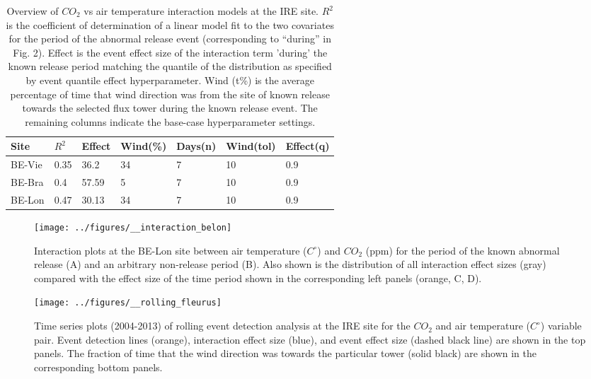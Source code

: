 \documentclass{article}
\begin{document}
\begin{table}[]
	\centering
	\caption{Overview of $CO_2$ vs air temperature interaction models at the IRE site. $R^2$ is the coefficient of determination of a linear model fit to the two covariates for the period of the abnormal release event (corresponding to “during” in Fig. 2). Effect is the event effect size of the interaction term 'during' the known release period matching the quantile of the distribution as specified by event quantile effect hyperparameter. Wind (t\%) is the average percentage of time that wind direction was from the site of known release towards the selected flux tower during the known release event. The remaining columns indicate the base-case hyperparameter settings.}
	\begin{tabular}{@{}lllllll@{}}
	\toprule
	Site & $R^2$ & Effect & Wind(\%) & Days(n) & Wind(tol) & Effect(q) \\ \midrule
	BE-Vie & 0.35 & 36.2  & 34 & 7 & 10 & 0.9  \\
	BE-Bra & 0.4 & 57.59  & 5 & 7 & 10 & 0.9 \\
	BE-Lon & 0.47 & 30.13 & 34 & 7 & 10 & 0.9 \\ \bottomrule
	\end{tabular}	
	\label{table:1}
	\end{table}

\begin{figure}
	\centering
	\texttt{[image: ../figures/\_\_interaction\_belon]}
	\caption{Interaction plots at the BE-Lon site between air temperature ($C^{\circ}$) and $CO_2$ (ppm) for the period of the known abnormal release (A) and an arbitrary non-release period (B). Also shown is the distribution of all interaction effect sizes (gray) compared with the effect size of the time period shown in the corresponding left panels (orange, C, D).}
	\label{fig:interaction}
\end{figure}


\begin{figure}
	\centering
	\texttt{[image: ../figures/\_\_rolling\_fleurus]}
	\caption{Time series plots (2004-2013) of rolling event detection analysis at the IRE site for the $CO_2$ and air temperature ($C^{\circ}$) variable pair. Event detection lines (orange), interaction effect size (blue), and event effect size (dashed black line) are shown in the top panels. The fraction of time that the wind direction was towards the particular tower (solid black) are shown in the corresponding bottom panels.}
	\label{fig:rolling}
\end{figure}
\end{document}
